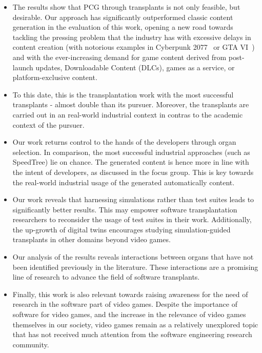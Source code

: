 \begin{itemize}
    
    \item The results show that PCG through transplants is not only feasible, but desirable. Our approach has significantly outperformed classic content generation in the evaluation of this work, opening a new road towards tackling the pressing problem that the industry has with excessive delays in content creation (with notorious examples in Cyberpunk 2077~\cite{cyberpunk2077} or GTA VI~\cite{gta6}) and with the ever-increasing demand for game content derived from post-launch updates, Downloadable Content (DLCs), games as a service, or platform-exclusive content.
    
    \item To this date, this is the transplantation work with the most successful transplants - almost double than its pursuer. Moreover, the transplants are carried out in an real-world industrial context in contras to the academic context of the pursuer.
    
    \item Our work returns control to the hands of the developers through organ selection. In comparison, the most successful industrial approaches (such as SpeedTree) lie on chance. The generated content is hence more in line with the intent of developers, as discussed in the focus group. This is key towards the real-world industrial usage of the generated automatically content.
    
    \item Our work reveals that harnessing simulations rather than test suites leads to significantly better results. This may empower software transplantation researchers to reconsider the usage of test suites in their work. Additionally, the up-growth of digital twins encourages studying simulation-guided transplants in other domains beyond video games.

    \item Our analysis of the results reveals interactions between organs that have not been identified previously in the literature. These interactions are a promising line of research to advance the field of software transplants.
    
    \item Finally, this work is also relevant towards raising awareness for the need of research in the software part of video games. Despite the importance of software for video games, and the increase in the relevance of video games themselves in our society, video games remain as a relatively unexplored topic that has not received much attention from the software engineering research community.
    
\end{itemize}

